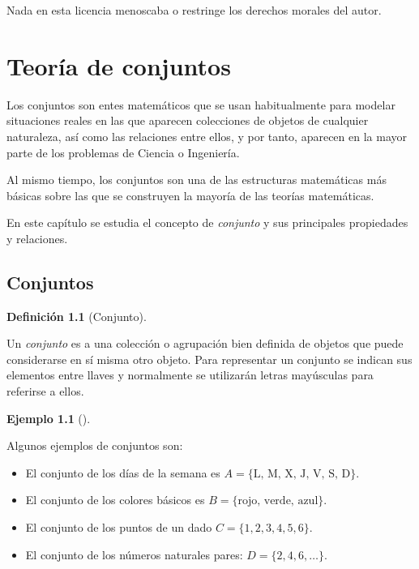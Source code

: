 \documentclass[
  a4paper,
]{scrreport}
\providecommand{\tightlist}{%
  \setlength{\itemsep}{0pt}\setlength{\parskip}{0pt}}\usepackage{longtable,booktabs,array}
\theoremstyle{definition}
\newtheorem{example}{Ejemplo}[chapter]
\theoremstyle{plain}
\theoremstyle{definition}
\newtheorem{definition}{Definición}[chapter]
\theoremstyle{definition}
\theoremstyle{plain}
\theoremstyle{plain}
\theoremstyle{remark}
\begin{document}
Nada en esta licencia menoscaba o restringe los derechos morales del
autor.


\chapter{Teoría de conjuntos}\label{teoruxeda-de-conjuntos}

Los conjuntos son entes matemáticos que se usan habitualmente para
modelar situaciones reales en las que aparecen colecciones de objetos de
cualquier naturaleza, así como las relaciones entre ellos, y por tanto,
aparecen en la mayor parte de los problemas de Ciencia o Ingeniería.

Al mismo tiempo, los conjuntos son una de las estructuras matemáticas
más básicas sobre las que se construyen la mayoría de las teorías
matemáticas.

En este capítulo se estudia el concepto de \emph{conjunto} y sus
principales propiedades y relaciones.

\section{Conjuntos}\label{conjuntos}

\begin{definition}[Conjunto]\protect\hypertarget{def-conjunto}{}\label{def-conjunto}

Un \emph{conjunto} es a una colección o agrupación bien definida de
objetos que puede considerarse en sí misma otro objeto. Para representar
un conjunto se indican sus elementos entre llaves y normalmente se
utilizarán letras mayúsculas para referirse a ellos.

\end{definition}

\begin{example}[]\protect\hypertarget{exm-conjuntos}{}\label{exm-conjuntos}

Algunos ejemplos de conjuntos son:

\begin{itemize}
\tightlist
\item
  El conjunto de los días de la semana es
  \(A = \{\mbox{L, M, X, J, V, S, D}\}\).
\item
  El conjunto de los colores básicos es
  \(B = \{\mbox{rojo, verde, azul}\}\).
\item
  El conjunto de los puntos de un dado \(C = \{ 1, 2, 3, 4, 5, 6 \}\).
\item
  El conjunto de los números naturales pares:
  \(D = \{2, 4, 6, \ldots \}\).
\end{itemize}

\end{example}
\end{document}
